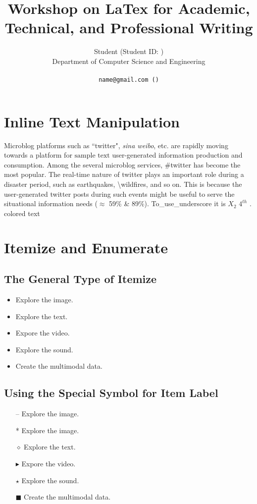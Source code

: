 \documentclass[11pt]{article}
\title{Workshop on LaTex for Academic, Technical, and Professional Writing}
\author{ Student (Student ID:  ) \\
  Department of Computer Science and Engineering \\
  \affaddr{University of Chittagong, Chittagong, Bangladesh}\\
  {\tt name@gmail.com (\Letter)} \\
}
\begin{document}
%
\maketitle
\thispagestyle{plain}
\pagestyle{plain}

\section{Inline Text Manipulation}
\label{ref:inlineText}
Microblog platforms such as ``twitter", \emph{sina weibo}, etc. are rapidly moving towards a platform for $\mbox{sample text}$ user-generated information production and consumption. Among the several microblog services, \#twitter has become the most popular. The real-time nature of twitter plays an {\color{red} important role during a disaster period}, such as earthquakes, \textbackslash{wildfires}, and so on. This is because the user-generated twitter posts during such events might be useful to serve the situational information needs ($\approx$ 59\% \& 89\%). To\_use\_underscore it is $X_{2}$ $4^{th}$ .
{\color{blue} colored text}



\section{Itemize and Enumerate}
\label{ref:itemize}

\subsection{The General Type of Itemize}
\begin{itemize}
\item Explore the image.
\item Explore the text.
\item Expore the video.
\item Explore the sound.
\item Create the multimodal data.
\end{itemize}

\subsection{Using the Special Symbol for Item Label}
\begin{itemize}
\item[--] Explore the image.
\item[*] Explore the image.
\item[$\diamond$] Explore the text.
\item[$\blacktriangleright$] Expore the video.
\item[$\star$] Explore the sound.
\item[$\blacksquare$] Create the multimodal data.
\end{itemize}
\end{document}
